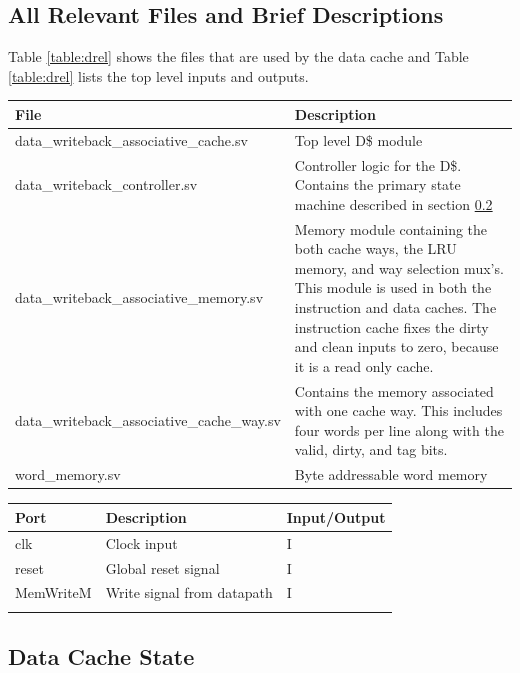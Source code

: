 
\subsection{All Relevant Files and Brief Descriptions}

	Table \ref{table:drel} shows the files that are used by the data cache and Table \ref{table:drel} lists the top level inputs and outputs.

	\begin{tabular}{|l|p{70mm}|}
	\hline File  & Description \\ 
	\hline  data\_writeback\_associative\_cache.sv & Top level D\$ module \\ 
	\hline  data\_writeback\_controller.sv & Controller logic for the D\$.
	Contains the primary state machine described in section \ref{sec:dstate} \\ 
	\hline  data\_writeback\_associative\_memory.sv & 
	Memory module containing the both cache ways, the LRU memory, and way selection mux's.
	This module is used in both the instruction and data caches.
	The instruction cache fixes the dirty and clean inputs to zero, because it is a read only cache.\\ 
	\hline  data\_writeback\_associative\_cache\_way.sv & 
	Contains the memory associated with one cache way. This includes four words per line along with the valid, dirty, and tag bits. \\ 
	\hline  word\_memory.sv & Byte addressable word memory  \\
	\hline
	\end{tabular} 
	\label{table:drel}

	\begin{tabular}{|l|p{60mm}|l|}
	\hline Port & Description & Input/Output \\ 
	\hline clk & Clock input &  I \\ 
	\hline reset & Global reset signal &  I \\ 
	\hline MemWriteM & Write signal from datapath &  I \\ 
	\hline  &  &  \\ 
	\hline
	\end{tabular} 
	\label{table:dio}

\subsection{Data Cache State}
\label{sec:dstate}

